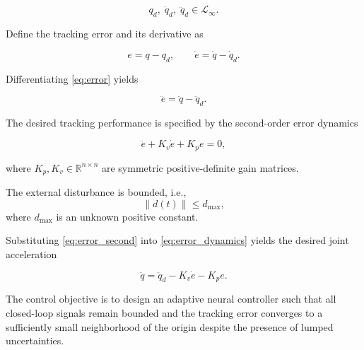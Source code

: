 \begin{equation}
	q_d,\;
	\dot q_d,\;
	\ddot q_d
	\in
	\mathcal{L}_{\infty}.
\end{equation}

Define the tracking error and its derivative as

\begin{equation}
	e=q-q_d,
	\qquad
	\dot e=\dot q-\dot q_d.
	\label{eq:error}
\end{equation}

Differentiating \eqref{eq:error} yields

\begin{equation}
	\ddot e=\ddot q-\ddot q_d.
	\label{eq:error_second}
\end{equation}

The desired tracking performance is specified by the second-order error dynamics

\begin{equation}
	\ddot e
	+
	K_v\dot e
	+
	K_pe
	=
	0,
	\label{eq:error_dynamics}
\end{equation}

where $K_p,K_v\in\mathbb{R}^{n\times n}$ are symmetric positive-definite gain matrices.

\begin{assumption}
	The external disturbance is bounded, i.e.,
	\begin{equation}
		\|d(t)\|\le d_{\max},
	\end{equation}
	where $d_{\max}$ is an unknown positive constant.
\end{assumption}

Substituting \eqref{eq:error_second} into \eqref{eq:error_dynamics} yields the desired joint acceleration

\begin{equation}
	\ddot q
	=
	\ddot q_d
	-
	K_v\dot e
	-
	K_pe.
	\label{eq:desired_acc}
\end{equation}

The control objective is to design an adaptive neural controller such that all closed-loop signals remain bounded and the tracking error converges to a sufficiently small neighborhood of the origin despite the presence of lumped uncertainties.
